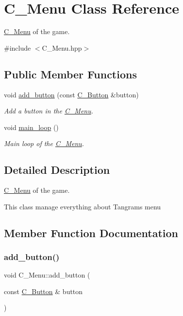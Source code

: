 \hypertarget{classMenu}{}\section{C_Menu Class Reference}
\label{classMenu}


\hyperlink{classMenu}{C_Menu} of the game.




{\ttfamily \#include $<$C_Menu.\+hpp$>$}

\subsection*{Public Member Functions}
\begin{DoxyCompactItemize}
\item 
void \hyperlink{classMenu_aaf6a2fb4408f8d5b5bdd7e633da53193}{add\+\_\+button} (const \hyperlink{classButton}{C_Button} \&button)
\begin{DoxyCompactList}\small\item\em Add a button in the \hyperlink{classMenu}{C_Menu}. \end{DoxyCompactList}\item
\mbox{\label{classMenu_a02baf39291517cea771a2e1cffed960e}} 
void \hyperlink{classMenu_a02baf39291517cea771a2e1cffed960e}{main\+\_\+loop} ()
\begin{DoxyCompactList}\small\item\em Main loop of the \hyperlink{classMenu}{C_Menu}. \end{DoxyCompactList}\end{DoxyCompactItemize}


\subsection{Detailed Description}
\hyperlink{classMenu}{C_Menu} of the game.

This class manage everything about Tangram\textquotesingle{}s menu 

\subsection{Member Function Documentation}
\mbox{\label{classMenu_aaf6a2fb4408f8d5b5bdd7e633da53193}} 
\subsubsection{\texorpdfstring{add\+\_\+button()}{add\_button()}}
{\footnotesize\ttfamily void C_Menu\+::add\+\_\+button (\begin{DoxyParamCaption}\item[{const \hyperlink{classButton}{C_Button} \&}]{button }\end{DoxyParamCaption})}



